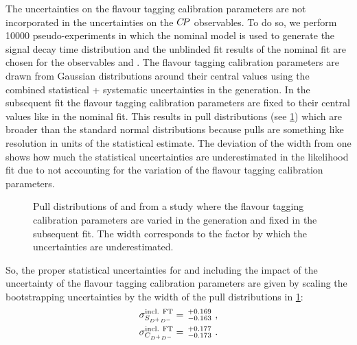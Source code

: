 The uncertainties on the flavour tagging calibration parameters are not
incorporated in the uncertainties on the ${C\!P}$ observables. To do so, we
perform \num{10000} pseudo-experiments in which the nominal model is used to
generate the signal decay time distribution and the unblinded fit results of
the nominal fit are chosen for the \CP observables \SDD and \CDD. The flavour
tagging calibration parameters are drawn from Gaussian distributions around
their central values using the combined statistical + systematic uncertainties
in the generation. In the subsequent fit the flavour tagging calibration
parameters are fixed to their central values like in the nominal fit. This
results in pull distributions (see \cref{fig:decaytimefit:tagging:pulls})
which are broader than the standard normal distributions because pulls are
something like resolution in units of the statistical estimate. The deviation
of the width from one shows how much the statistical uncertainties are
underestimated in the likelihood fit due to not accounting for the variation
of the flavour tagging calibration parameters.
%
\begin{figure}[!htb]
\caption{Pull distributions of \SDD and \CDD from a study where the flavour
tagging calibration parameters are varied in the generation and fixed in the
subsequent fit. The width corresponds to the factor by which the uncertainties
are underestimated.}
\label{fig:decaytimefit:tagging:pulls}
\end{figure}
%
So, the proper statistical uncertainties for \SDD and \CDD including the
impact of the uncertainty of the flavour tagging calibration parameters are
given by scaling the bootstrapping uncertainties by the width of the pull
distributions in \cref{fig:decaytimefit:tagging:pulls}:
%
\begin{align}
    \sigma^{\text{incl. FT}}_{S_{{{D}^+}{{D}^-}}} &= \,^{+0.169}_{-0.163} \ , \\
    \sigma^{\text{incl. FT}}_{C_{{{D}^+}{{D}^-}}} &= \,^{+0.177}_{-0.173} \ .
\end{align}
